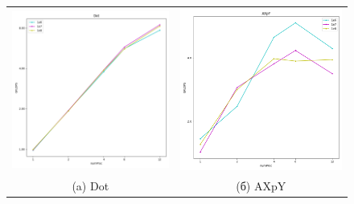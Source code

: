 \documentclass[12pt, a4paper]{article}
\begin{document}
\begin{figure}[H]
	\center
	\begin{tabular}{cc}
		\includegraphics[width=85mm]{2025/mpi_dot} & \includegraphics[width=85mm]{2025/mpi_axpy} \\
		(a) Dot & (б) AXpY \\

\end{tabular}
\end{figure}
\end{document}
